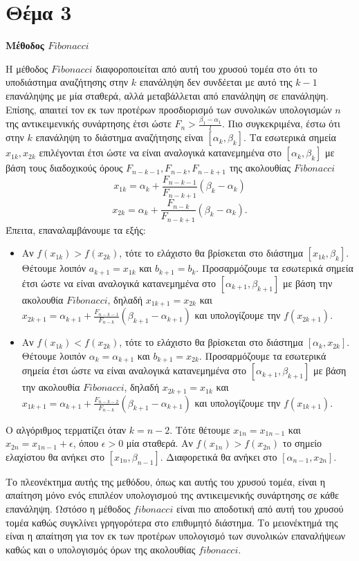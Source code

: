 \documentclass{article}
\begin{document}
\section*{Θέμα 3}
\textbf{Μέθοδος $Fibonacci$}

Η μέθοδος $Fibonacci$ διαφοροποιείται από αυτή του χρυσού τομέα στο ότι το υποδιάστημα αναζήτησης στην $k$
επανάληψη δεν συνδέεται με αυτό της $k - 1$ επανάληψης με μία σταθερά, αλλά μεταβάλλεται από επανάληψη σε
επανάληψη. Επίσης, απαιτεί τον εκ των προτέρων προσδιορισμό των συνολικών υπολογισμών $n$ της αντικειμενικής
συνάρτησης έτσι ώστε $F_n > \frac{\beta_1 - \alpha_1}{l}$. Πιο συγκεκριμένα, έστω ότι στην $k$ επανάληψη το 
διάστημα αναζήτησης είναι $[\alpha_k, \beta_k]$. Τα εσωτερικά σημεία $x_{1k}, x_{2k}$ επιλέγονται έτσι ώστε 
να είναι αναλογικά κατανεμημένα στο $[\alpha_k, \beta_k]$ με βάση τους διαδοχικούς όρους 
$F_{n-k-1}, F_{n-k}, F_{n-k+1}$ της ακολουθίας $Fibonacci$
\[ x_{1k} = \alpha_k + \frac{F_{n-k-1}}{F_{n-k+1}}(\beta_k - \alpha_k) \] 
\[ x_{2k} = \alpha_k + \frac{F_{n-k}}{F_{n-k+1}}(\beta_k - \alpha_k). \]
Έπειτα, επαναλαμβάνουμε τα εξής:
\begin{itemize}
    \item Αν $f(x_{1k}) > f(x_{2k})$, τότε το ελάχιστο θα βρίσκεται στο διάστημα $[x_{1k}, \beta_k]$.
    Θέτουμε λοιπόν $a_{k+1} = x_{1k}$ και $b_{k+1} = b_k$. Προσαρμόζουμε τα εσωτερικά σημεία έτσι ώστε
    να είναι αναλογικά κατανεμημένα στο $[\alpha_{k+1}, \beta_{k+1}]$ με βάση την ακολουθία $Fibonacci$,
    δηλαδή $x_{1k+1} = x_{2k}$ και $x_{2k+1} = \alpha_{k+1} + \frac{F_{n-k-1}}{F_{n-k}}(\beta_{k+1} - \alpha_{k+1})$
    και υπολογίζουμε την $f(x_{2k+1})$.
    \item Αν $f(x_{1k}) < f(x_{2k})$, τότε το ελάχιστο θα βρίσκεται στο διάστημα $[\alpha_k, x_{2k}]$.
    Θέτουμε λοιπόν $\alpha_k = \alpha_{k+1}$ και $b_{k+1} = x_{2k}$. Προσαρμόζουμε τα εσωτερικά σημεία έτσι ώστε
    να είναι αναλογικά κατανεμημένα στο $[\alpha_{k+1}, \beta_{k+1}]$ με βάση την ακολουθία $Fibonacci$,
    δηλαδή $x_{2k+1} = x_{1k}$ και $x_{1k+1} = \alpha_{k+1} + \frac{F_{n-k-2}}{F_{n-k}}(\beta_{k+1} - \alpha_{k+1})$
    και υπολογίζουμε την $f(x_{1k+1})$.
\end{itemize}
Ο αλγόριθμος τερματίζει όταν $k = n - 2$. Τότε θέτουμε $x_{1n} = x_{1n-1}$ και $x_{2n} = x_{1n-1} + \epsilon$, όπου
$\epsilon > 0$ μία σταθερά. Αν $f(x_{1n}) > f(x_{2n})$ το σημείο ελαχίστου θα ανήκει στο $[x_{1n}, \beta_{n-1}]$.
Διαφορετικά θα ανήκει στο $[\alpha_{n-1}, x_{2n}]$.

Το πλεονέκτημα αυτής της μεθόδου, όπως και αυτής του χρυσού τομέα, είναι η απαίτηση μόνο ενός επιπλέον
υπολογισμού της αντικειμενικής συνάρτησης σε κάθε επανάληψη. Ωστόσο η μέθοδος $fibonacci$ είναι πιο αποδοτική
από αυτή του χρυσού τομέα καθώς συγκλίνει γρηγορότερα στο επιθυμητό διάστημα. Το μειονέκτημά της είναι η
απαίτηση για τον εκ των προτέρων υπολογισμό των συνολικών επαναλήψεων καθώς και ο υπολογισμός όρων της ακολουθίας
$fibonacci$.
\end{document}
